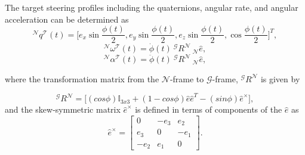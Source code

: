 \documentclass[letterpaper, paper,12pt]{AAS}		%
\begin{document}
	
	
		The target steering profiles including the quaternions, angular rate, and angular acceleration can be determined as
		\begin{equation}\label{quatT}
		^\mathcal{N}q^\mathcal{T}(t)=\Big[e_x\sin\frac{\phi(t)}{2}, e_y\sin\frac{\phi(t)}{2}, e_z\sin\frac{\phi(t)}{2}, \cos\frac{\phi(t)}{2}\Big]^T,
		\end{equation}
		\begin{equation}\label{omegaT}
		^\mathcal{N}\omega^\mathcal{T}(t)=\dot{\phi}(t)\ ^\mathcal{G}R^\mathcal{N}\ _\mathcal{N}\hat{e},
		\end{equation}
		\begin{equation}\label{alpha_1}
		^\mathcal{N}\alpha^\mathcal{T}(t)=\ddot{\phi}(t)\ ^\mathcal{G}R^\mathcal{N}\ _\mathcal{N}\hat{e},
		\end{equation}

		
where the transformation matrix from the $\mathcal{N}$-frame to $\mathcal{G}$-frame, $^\mathcal{G}R^\mathcal{N}$ is given by

\begin{equation} \label{G_R_N}
^\mathcal{G}R^\mathcal{N}= \big[(cos\phi)\mathbb{I}_{3x3} + (1 - cos\phi)\hat{e}\hat{e}^T - (sin\phi)\hat{e}^\times \big],
\end{equation}
and the skew-symmetric matrix $\hat{e}^\times$ is defined in terms of components of the $\hat{e}$ as
\begin{equation}
	\hat{e}^\times=\begin{bmatrix}
	0 & -e_3 & e_2 \\
	 e_3 & 0& -e_1 \\
	-e_2 & e_1 & 0  
	\end{bmatrix}.
\end{equation}
\end{document}
